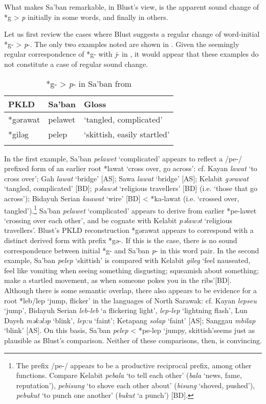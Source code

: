 \documentclass[output=paper]{langscibook}
\begin{document}
What makes Sa’ban remarkable, in Blust’s view, is the apparent sound change of *g > \textit{p} initially in some words, and finally in others. 

Let us first review the cases where Blust suggests a regular change of word-initial *g- > \textit{p}-. The only two examples noted are shown in . Given the seemingly regular correspondence of *g- with \textit{j}- in , it would appear that these examples do not constitute a case of regular sound change.

\begin{table}
\begin{tabularx}{\textwidth}{XXX}
\lsptoprule
 {PKLD} &  {Sa’ban} &  {Gloss}\\
\midrule
*gərawat & pelawet & ‘tangled, complicated’  \\
*giləg & pelep & ‘skittish, easily startled’\\
\lspbottomrule
\end{tabularx}
\caption{\label{tab:blevins:9}*g- > \textit{p}- in Sa’ban from \citet{Blust2005, Blust2018}}
\end{table}

In the first example, Sa’ban \textit{pelawet} ‘complicated’ appears to reflect a \mbox{/pe-/} prefixed form of an earlier root *lawat ‘cross over, go across’: cf. Kayan \textit{lawat} ‘to cross over’; Gah \textit{lawat} ‘bridge’ [AS]; Sawa \textit{lawat} ‘bridge’ [AS]; Kelabit \textit{gərawat} ‘tangled, complicated’ [BD]; \textit{pəlawət} ‘religious travellers’ [BD] (i.e. ‘those that go across’); Bidayuh Serian \textit{kaawat} ‘wire’ [BD] < *ka-lawat (i.e. ‘crossed over, tangled’).\footnote{The prefix \mbox{/pe-/} appears to be a productive reciprocal prefix, among other functions. Compare Kelabit \textit{pebala} ‘to tell each other’ (\textit{bala} ‘news, fame, reputation’), \textit{pebisung} ‘to shove each other about’ (\textit{bisung} ‘shoved, pushed’), \textit{pebukut} ‘to punch one another’ (\textit{bukut} ‘a punch’) [BD].} Sa’ban \textit{pelawet} ‘complicated’ appears to derive from earlier *pe-lawet ‘crossing over each other’, and be cognate with Kelabit \textit{pəlawət} ‘religious travellers’.  Blust’s PKLD reconstruction *gərawat appears to correspond with a distinct derived form with prefix *gə-. If this is the case, there is no sound correspondence between initial *g- and Sa’ban \textit{p}- in this word pair. In the second example, Sa’ban \textit{pelep} ‘skittish’ is compared with Kelabit \textit{gileg} ‘feel nauseated, feel like vomiting when seeing something disgusting; squeamish about something; make a startled movement, as when someone pokes you in the ribs’[BD]. Although there is some semantic overlap, there also appears to be evidence for a root *leb/lep ‘jump, flicker’ in the languages of North Sarawak: cf. Kayan \textit{lepseu} ‘jump’, Bidayuh Serian \textit{leb-leb} ‘a flickering light’, \textit{lep-lep} ‘lightning flash’, Lun Dayeh \textit{məkələp} ‘blink’, \textit{lep:u} ‘faint’; Ketapang \textit{solap} ‘faint’ [AS]; Sanggau \textit{mbilap} ‘blink’ [AS]. On this basis, Sa’ban \textit{pelep} < *pe-lep ‘jumpy, skittish’seems just as plausible as Blust’s comparison. Neither of these comparisons, then, is convincing.
\end{document}

